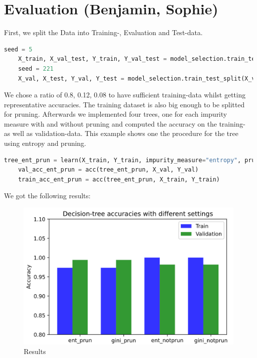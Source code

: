 \documentclass[12pt,a4paper]{scrartcl}		%
\begin{document}
\section{Evaluation (Benjamin, Sophie)}
First, we split the Data into Training-, Evaluation and Test-data. 

\begin{lstlisting}[language=Python]
    seed = 5
    X_train, X_val_test, Y_train, Y_val_test = model_selection.train_test_split(X, y, test_size= 0.2, shuffle=True, random_state = seed)
    seed = 221
    X_val, X_test, Y_val, Y_test = model_selection.train_test_split(X_val_test, Y_val_test, test_size= 0.4, shuffle=True, random_state = seed)
\end{lstlisting}

We chose a ratio of 0.8, 0.12, 0.08 to have sufficient training-data whilst getting representative accuracies.
The training dataset is also big enough to be splitted for pruning. 
Afterwards we implemented four trees, one for each impurity measure with and without pruning and computed the 
accuracy on the training- as well as validation-data. This example shows one the procedure for the tree using 
entropy and pruning. 

\begin{lstlisting}[language=Python]
    tree_ent_prun = learn(X_train, Y_train, impurity_measure="entropy", pruning=True)
    val_acc_ent_prun = acc(tree_ent_prun, X_val, Y_val)
    train_acc_ent_prun = acc(tree_ent_prun, X_train, Y_train)
\end{lstlisting}

We got the following results: 

\begin{figure}[h]
    \centering
    \includegraphics[scale = 0.8]{results.png}
    \caption{Results}
\end{figure}
\end{document}
